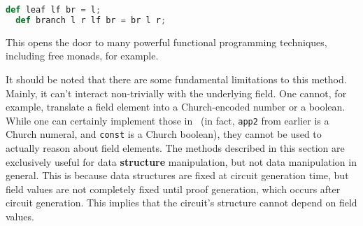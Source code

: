 \begin{lstlisting}[language=Python]
  def leaf lf br = l;
  def branch l r lf br = br l r;
\end{lstlisting}

This opens the door to many powerful functional programming techniques, including free monads, for example.

It should be noted that there are some fundamental limitations to this method. Mainly, it can't interact non-trivially with the underlying field. One cannot, for example, translate a field element into a Church-encoded number or a boolean. While one can certainly implement those in \vampir\ (in fact, \lstinline|app2| from earlier is a Church numeral, and \lstinline|const| is a Church boolean), they cannot be used to actually reason about field elements. The methods described in this section are exclusively useful for data \textbf{structure} manipulation, but not data manipulation in general. This is because data structures are fixed at circuit generation time, but field values are not completely fixed until proof generation, which occurs after circuit generation. This implies that the circuit's structure cannot depend on field values.